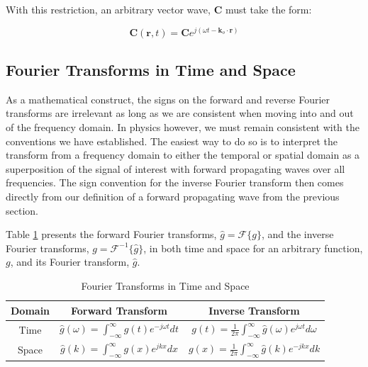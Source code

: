 With this restriction, an arbitrary vector wave, $\mathbf{C}$ must take the form:

\begin{equation}
\mathbf{C}\left(\mathbf{r},t\right) = \mathbf{C}e^{j\left(\omega t - \mathbf{k}_o \cdot \mathbf{r} \right)}
\label{gf_eq:18b}
\end{equation}
\renewcommand{\baselinestretch}{2} \small\normalsize

\subsection {Fourier Transforms in Time and Space} \label{gf_sec:fourier_transform}
As a mathematical construct, the signs on the forward and reverse Fourier transforms are irrelevant as long as we are consistent when moving into and out of the frequency domain. In physics however, we must remain consistent with the conventions we have established. The easiest way to do so is to interpret the transform from a frequency domain to either the temporal or spatial domain as a superposition of the signal of interest with forward propagating waves over all frequencies. The sign convention for the inverse Fourier transform then comes directly from our definition of a forward propagating wave from the previous section.  

Table \ref{gf_tab:0a} presents the forward Fourier transforms, $\hat{g} = \mathcal{F}\{g\}$, and the inverse Fourier transforms, $g = \mathcal{F}^{-1}\{\hat{g}\}$, in both time and space for an arbitrary function, $g$, and its Fourier transform, $\hat{g}$.

\begin{table}[ht]
  \centering
  \begin{quote}
    \caption[Fourier Transforms in Time and Space]{Fourier Transforms in Time and Space\label{gf_tab:0a}}
  \end{quote}
  \begin{tabular} {|c | c | c|}
    \hline
  \bf{Domain} & \bf{Forward Transform} & \bf{Inverse Transform}\\ \hline
  Time & $\displaystyle \hat{g}(\omega) = \int_{-\infty}^{\infty} g(t)e^{-j\omega t}dt$ & $\displaystyle  g(t) = \frac{1}{2\pi}\int_{-\infty}^\infty \hat{g}(\omega)e^{j\omega t}d\omega$\\[5pt] \hline
 Space & $\displaystyle \hat{g}(k) = \int_{-\infty}^{\infty} g(x)e^{jk x}dx$ & $\displaystyle  g(x) = \frac{1}{2\pi}\int_{-\infty}^\infty \hat{g}(k)e^{-jk x}dk$\\[5pt] \hline
\end{tabular}

\end{table}
\renewcommand{\baselinestretch}{2} \small\normalsize

